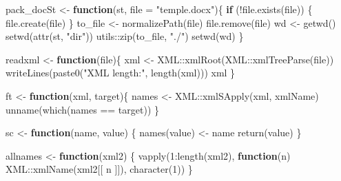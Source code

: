 \documentclass[
]{article}
\newenvironment{Shaded}{\begin{snugshade}}{\end{snugshade}}
\newcommand{\AttributeTok}[1]{\textcolor[rgb]{0.77,0.63,0.00}{#1}}
\newcommand{\ControlFlowTok}[1]{\textcolor[rgb]{0.13,0.29,0.53}{\textbf{#1}}}
\newcommand{\DecValTok}[1]{\textcolor[rgb]{0.00,0.00,0.81}{#1}}
\newcommand{\FunctionTok}[1]{\textcolor[rgb]{0.00,0.00,0.00}{#1}}
\newcommand{\NormalTok}[1]{#1}
\newcommand{\OtherTok}[1]{\textcolor[rgb]{0.56,0.35,0.01}{#1}}
\newcommand{\SpecialCharTok}[1]{\textcolor[rgb]{0.00,0.00,0.00}{#1}}
\newcommand{\StringTok}[1]{\textcolor[rgb]{0.31,0.60,0.02}{#1}}
\begin{document}
\begin{Shaded}
\begin{Highlighting}[]
\NormalTok{pack\_docSt }\OtherTok{\textless{}{-}} \ControlFlowTok{function}\NormalTok{(st, }\AttributeTok{file =} \StringTok{"temple.docx"}\NormalTok{)\{}
  \ControlFlowTok{if}\NormalTok{ (}\SpecialCharTok{!}\FunctionTok{file.exists}\NormalTok{(file)) \{}
    \FunctionTok{file.create}\NormalTok{(file)}
\NormalTok{  \}}
\NormalTok{  to\_file }\OtherTok{\textless{}{-}} \FunctionTok{normalizePath}\NormalTok{(file)}
  \FunctionTok{file.remove}\NormalTok{(file)}
\NormalTok{  wd }\OtherTok{\textless{}{-}} \FunctionTok{getwd}\NormalTok{()}
  \FunctionTok{setwd}\NormalTok{(}\FunctionTok{attr}\NormalTok{(st, }\StringTok{"dir"}\NormalTok{))}
\NormalTok{  utils}\SpecialCharTok{::}\FunctionTok{zip}\NormalTok{(to\_file, }\StringTok{"./"}\NormalTok{)}
  \FunctionTok{setwd}\NormalTok{(wd)}
\NormalTok{\}}

\NormalTok{readxml }\OtherTok{\textless{}{-}} \ControlFlowTok{function}\NormalTok{(file)\{}
\NormalTok{  xml }\OtherTok{\textless{}{-}}\NormalTok{ XML}\SpecialCharTok{::}\FunctionTok{xmlRoot}\NormalTok{(XML}\SpecialCharTok{::}\FunctionTok{xmlTreeParse}\NormalTok{(file))}
  \FunctionTok{writeLines}\NormalTok{(}\FunctionTok{paste0}\NormalTok{(}\StringTok{"XML length:"}\NormalTok{, }\FunctionTok{length}\NormalTok{(xml)))}
\NormalTok{  xml}
\NormalTok{\}}

\NormalTok{ft }\OtherTok{\textless{}{-}} \ControlFlowTok{function}\NormalTok{(xml, target)\{}
\NormalTok{  names }\OtherTok{\textless{}{-}}\NormalTok{ XML}\SpecialCharTok{::}\FunctionTok{xmlSApply}\NormalTok{(xml, xmlName)}
  \FunctionTok{unname}\NormalTok{(}\FunctionTok{which}\NormalTok{(names }\SpecialCharTok{==}\NormalTok{ target))}
\NormalTok{\}}

\NormalTok{sc }\OtherTok{\textless{}{-}} \ControlFlowTok{function}\NormalTok{(name, value) \{}
  \FunctionTok{names}\NormalTok{(value) }\OtherTok{\textless{}{-}}\NormalTok{ name}
  \FunctionTok{return}\NormalTok{(value)}
\NormalTok{\}}

\NormalTok{allnames }\OtherTok{\textless{}{-}} \ControlFlowTok{function}\NormalTok{(xml2) \{}
  \FunctionTok{vapply}\NormalTok{(}\DecValTok{1}\SpecialCharTok{:}\FunctionTok{length}\NormalTok{(xml2), }\ControlFlowTok{function}\NormalTok{(n) XML}\SpecialCharTok{::}\FunctionTok{xmlName}\NormalTok{(xml2[[ n ]]), }\FunctionTok{character}\NormalTok{(}\DecValTok{1}\NormalTok{))}
\NormalTok{\}}


\end{Highlighting}
\end{Shaded}
\end{document}
